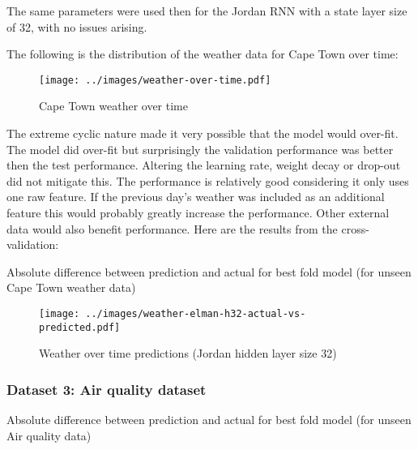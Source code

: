 \documentclass[conference]{IEEEtran}
\begin{document}
The same parameters were used then for the Jordan RNN with a state layer size of 32, with no issues arising.

The following is the distribution of the weather data for Cape Town over time:

\begin{figure}[htbp] 
	\centering
	\texttt{[image: ../images/weather-over-time.pdf]}
	\caption{Cape Town weather over time}
	\label{fig:cape-town-weather-time}
\end{figure}

The extreme cyclic nature made it very possible that the model would over-fit. The model did over-fit but surprisingly the validation performance was better then the test performance. Altering the learning rate, weight decay or drop-out did not mitigate this. The performance is relatively good considering it only uses one raw feature. If the previous day's weather was included as an additional feature this would probably greatly increase the performance. Other external data would also benefit performance. Here are the results from the cross-validation:

\begin{table}[htbp]
	\caption{Absolute difference between prediction and actual for best fold model (for unseen Cape Town weather data)}
	\label{tab:weather-rnn-summary}
\end{table}

\begin{figure}[H] 
	\centering
	\texttt{[image: ../images/weather-elman-h32-actual-vs-predicted.pdf]}
	\caption{Weather over time predictions (Jordan hidden layer size 32)}
	\label{fig:weather-predictions-elman}
\end{figure}

\subsubsection{Dataset 3: Air quality dataset}

\begin{table}[htbp]
	\caption{Absolute difference between prediction and actual for best fold model (for unseen Air quality data)}
	\label{tab:weather-rnn-summary}
\end{table}
\end{document}

